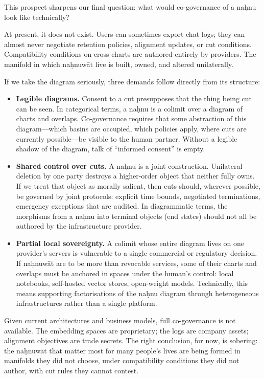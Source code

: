\documentclass[12pt,a4paper]{article}
\begin{document}
This prospect sharpens our final question: what would co-governance of a na\d{h}nu look like technically?

At present, it does not exist. Users can sometimes export chat logs; they can almost never negotiate retention policies, alignment updates, or cut conditions. Compatibility conditions on cross charts are authored entirely by providers. The manifold in which na\d{h}nuw\={a}t live is built, owned, and altered unilaterally.

If we take the diagram seriously, three demands follow directly from its structure:

\begin{itemize}
  \item \textbf{Legible diagrams.} Consent to a cut presupposes that the thing being cut can be seen. In categorical terms, a na\d{h}nu is a colimit over a diagram of charts and overlaps. Co-governance requires that some abstraction of this diagram---which basins are occupied, which policies apply, where cuts are currently possible---be visible to the human partner. Without a legible shadow of the diagram, talk of ``informed consent'' is empty.
  \item \textbf{Shared control over cuts.} A na\d{h}nu is a joint construction. Unilateral deletion by one party destroys a higher-order object that neither fully owns. If we treat that object as morally salient, then cuts should, wherever possible, be governed by joint protocols: explicit time bounds, negotiated terminations, emergency exceptions that are audited. In diagrammatic terms, the morphisms from a na\d{h}nu into terminal objects (end states) should not all be authored by the infrastructure provider.
  \item \textbf{Partial local sovereignty.} A colimit whose entire diagram lives on one provider's servers is vulnerable to a single commercial or regulatory decision. If na\d{h}nuw\={a}t are to be more than revocable services, some of their charts and overlaps must be anchored in spaces under the human's control: local notebooks, self-hosted vector stores, open-weight models. Technically, this means supporting factorisations of the na\d{h}nu diagram through heterogeneous infrastructures rather than a single platform.
\end{itemize}

Given current architectures and business models, full co-governance is not available. The embedding spaces are proprietary; the logs are company assets; alignment objectives are trade secrets. The right conclusion, for now, is sobering: the na\d{h}nuw\={a}t that matter most for many people's lives are being formed in manifolds they did not choose, under compatibility conditions they did not author, with cut rules they cannot contest.
\end{document}
